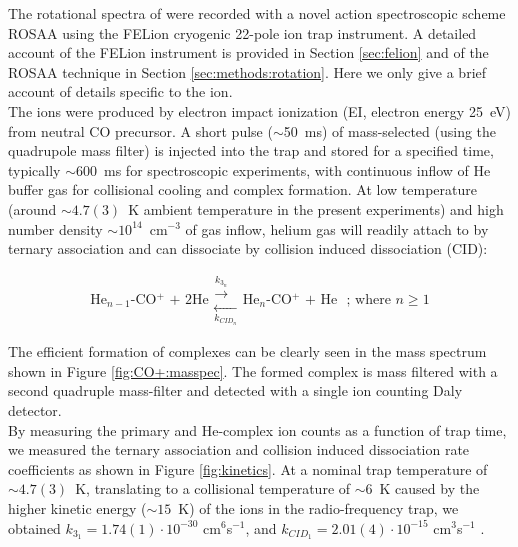The rotational spectra of \co  were recorded with a novel action spectroscopic scheme ROSAA using the FELion cryogenic 22-pole ion trap instrument. A detailed account of the FELion instrument is provided in Section \ref{sec:felion} and of the ROSAA technique in Section \ref{sec:methods:rotation}. Here we only give a brief account of details specific to the \co ion. \\

The ions were produced by electron impact ionization (EI, electron energy 25~eV) from neutral CO precursor. A short pulse ($\sim$50~ms) of mass-selected (using the quadrupole mass filter) \co is injected into the trap and stored for a specified time, typically $\sim$600~ms for spectroscopic experiments, with continuous inflow of He buffer gas for collisional cooling and complex formation. At low temperature (around $\sim 4.7(3)$~K ambient temperature in the present experiments) and high number density $\sim10^{14}$~cm$^{-3}$ of gas inflow, helium gas will readily attach to \co by ternary association and can dissociate by collision induced dissociation (CID): 


\begin{equation}
\text{He$_{n-1}$-CO$^+$ + 2He}
\substack{\overset{k_{3_n}} \longrightarrow \\ \underset{k_{CID_n}} \longleftarrow}
\text{He$_n$-CO$^+$ + He }
\text{ ; where $n\geq 1$}
\label{eqn:fulleq}
\end{equation}

The efficient formation of complexes can be clearly seen in the mass spectrum shown in Figure \ref{fig:CO+:masspec}. The formed complex is mass filtered with a second quadruple mass-filter and detected with a single ion counting Daly detector\cite{daly_scintillation_1960}. \\

By measuring the primary \co and He-\co complex ion counts as a function of trap time, we measured the ternary association and collision induced dissociation rate coefficients as shown in Figure \ref{fig:kinetics}. At a nominal trap temperature of  $\sim 4.7(3)$~K, translating to a collisional temperature of $ \sim 6$~K caused by the higher kinetic energy ($\sim 15$~K) of the ions in the radio-frequency trap, we obtained $k_{3_1}=1.74(1)\cdot10^{-30}$ cm$^6$s$^{-1}$, and  $k_{CID_1}=2.01(4)\cdot10^{-15}$ cm$^3$s$^{-1}$ .\\

